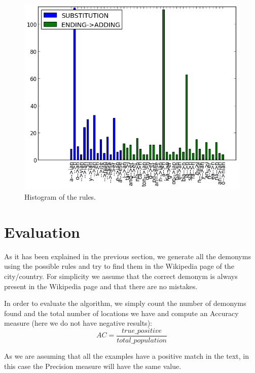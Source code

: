 \documentclass[]{article}
\begin{document}
\begin{figure}[htb!]
\centering
\includegraphics[scale=0.6]{img/rules}
\caption{Histogram of the rules.}
\label{Histogram of the rules.}
\end{figure}




\section{Evaluation}

As it has been explained in the previous section, we generate all the demonyms using the possible rules and try to find them in the Wikipedia page of the city/country. For simplicity we assume that the correct demonym is always present in the Wikipedia page and that there are no mistakes.

In order to evaluate the algorithm, we simply count the number of demonyms found and the total number of locations we have and compute an Accuracy measure (here we do not have negative results):
$$
AC = \frac{true\_positive}{total\_population}
$$

As we are assuming that all the examples have a positive match in the text, in this case the Precision measure will have the same value.
\end{document}
